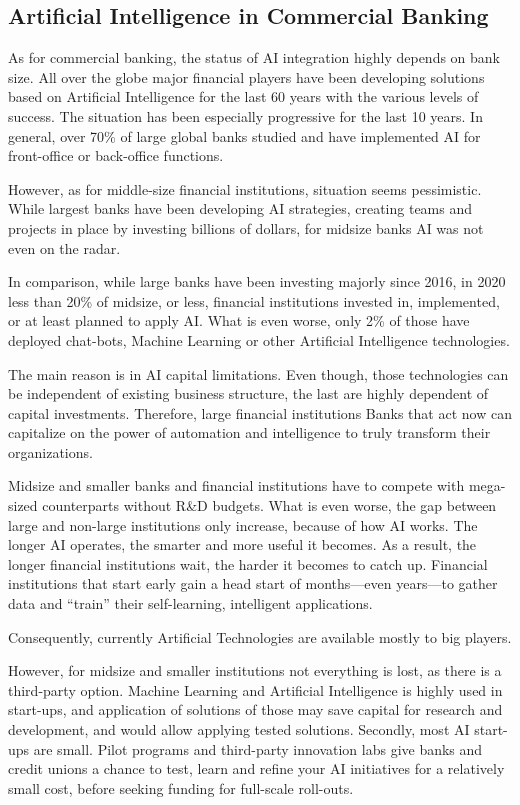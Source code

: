 \subsection{Artificial Intelligence in Commercial Banking}

As for commercial banking, the status of AI integration highly depends on bank size.
All over the globe major financial players have been developing solutions based on Artificial Intelligence for the last 60 years with the various levels of success.
The situation has been especially progressive for the last 10 years.
In general, over 70\% of large global banks studied and have implemented AI for front-office or back-office functions.
\cite{deloitte_thriving_in_ai_era}

However, as for middle-size financial institutions, situation seems pessimistic.
While largest banks have been developing AI strategies, creating teams and projects in place by investing billions of dollars, for midsize banks AI was not even on the radar.

In comparison, while large banks have been investing majorly since 2016, in 2020 less than 20\% of midsize, or less, financial institutions invested in, implemented, or at least planned to apply AI.
What is even worse, only 2\% of those have deployed chat-bots, Machine Learning or other Artificial Intelligence technologies.
\cite{ai_transform_disrupt}

The main reason is in AI capital limitations.
Even though, those technologies can be independent of existing business structure, the last are highly dependent of capital investments.
Therefore, large financial institutions Banks that act now can capitalize on the power of automation and intelligence to truly transform their organizations.


Midsize and smaller banks and financial institutions have to compete with mega-sized counterparts without R\&D budgets.
What is even worse, the gap between large and non-large institutions only increase, because of how AI works.
The longer AI operates, the smarter and more useful it becomes.
As a result, the longer financial institutions wait, the harder it becomes to catch up. 
Financial institutions that start early gain a head start of months—even years—to gather data and “train” their self-learning, intelligent applications. 


Consequently, currently Artificial Technologies are available mostly to big players.

However, for midsize and smaller institutions not everything is lost, as there is a third-party option.
Machine Learning and Artificial Intelligence is highly used in start-ups, and application of solutions of those may save capital for research and development, and would allow applying tested solutions.
Secondly, most AI start-ups are small. 
Pilot programs and third-party innovation labs give banks and credit unions a chance to test, learn and refine your AI initiatives for a relatively small cost, before seeking funding for full-scale roll-outs.


